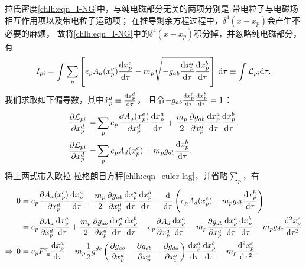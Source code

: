 拉氏密度\eqref{chlh:eqn_I-NG}中，与纯电磁部分无关的两项分别是
带电粒子与电磁场相互作用项以及带电粒子运动项；
在推导剩余方程过程中，$\delta^4(x-x_p)$会产生不必要的麻烦，
故将\eqref{chlh:eqn_I-NG}中的$\delta^4(x-x_p)$积分掉，并忽略纯电磁部分，有
\begin{equation}
    I_{pi} = \int \sum_{p}\left[ e_{p} A_{a}(x_p^\nu) \frac{{\rm d} x^a_p}{{\rm d} \tau} 
    -  m_p  \sqrt{-g_{ab} \frac{{\rm d} x_p^a}{{\rm d} \tau}
        \frac{{\rm d}x_p^b}{{\rm d} \tau} } \right]  \, {\rm d} \tau 
    \equiv \int \mathcal{L}_{pi} {\rm d}\tau.
\end{equation}
我们求取如下偏导数，其中$\dot{x}^d_p\equiv \frac{{\rm d}x_p^d}{{\rm d} \tau}$，
且令$-g_{ab} \frac{{\rm d} x_p^a}{{\rm d} \tau}\frac{{\rm d}x_p^b}{{\rm d} \tau}=1$：
\begin{align}
    \frac{\partial \mathcal{L}_{pi}}{\partial x^d_p}=& \sum_{p}
    e_{p} \frac{\partial A_{a}(x_p^e)}{\partial x^d_p} \frac{{\rm d} x^a_p}{{\rm d} \tau} 
    +\frac{m_p}{2} \frac{\partial g_{ab}}{\partial x^d_p}\frac{{\rm d} x_p^a}{{\rm d} \tau}
    \frac{{\rm d}x_p^b}{{\rm d} \tau} . \\
    \frac{\partial \mathcal{L}_{pi}}{\partial \dot{x}^d_p}=& \sum_{p}
    e_p A_d(x_p^e) + m_p g_{db} \frac{{\rm d} x_p^b}{{\rm d} \tau} .
\end{align}
将上两式带入欧拉-拉格朗日方程\eqref{chlh:eqn_euler-lag}，并省略$\sum_{p}$，有
\setlength{\mathindent}{0em}
\begin{align*}
    0&=e_{p} \frac{\partial A_{a}(x_p^e)}{\partial x^d_p} \frac{{\rm d} x^a_p}{{\rm d} \tau} 
    +\frac{m_p}{2} \frac{\partial g_{ab}}{\partial x^d_p}\frac{{\rm d} x_p^a}{{\rm d} \tau}
    \frac{{\rm d}x_p^b}{{\rm d} \tau}
    - \frac{{\rm d}}{{\rm d}{\tau}} \left( e_p A_d(x_p^e) 
    + m_p g_{db} \frac{{\rm d} x_p^b}{{\rm d} \tau}\right)  \\
    &= e_{p} \frac{\partial A_{a}}{\partial x^d_p} \frac{{\rm d} x^a_p}{{\rm d} \tau} 
    +\frac{m_p}{2} \frac{\partial g_{ab}}{\partial x^d_p}\frac{{\rm d} x_p^a}{{\rm d} \tau}
    \frac{{\rm d}x_p^b}{{\rm d} \tau}
    -e_{p} \frac{\partial A_{d}}{\partial x^a_p} \frac{{\rm d} x^a_p}{{\rm d} \tau} 
    -m_p \frac{\partial g_{db}}{\partial x_p^a} \frac{{\rm d} x_p^a}{{\rm d} \tau}\frac{{\rm d} x_p^b}{{\rm d} \tau}
    -m_p g_{dc} \frac{{\rm d}^2 x_p^c}{{\rm d} \tau^2} \\
   \Rightarrow\, 0 &= {e_p} F_{\hphantom{c}a}^c \frac{{\rm d} x^a_p}{{\rm d} \tau} 
    +m_p\frac{1}{2}g^{dc} \left( \frac{\partial g_{ab}}{\partial x_p^d}
    -\frac{\partial g_{db}}{\partial x_p^a} -\frac{\partial g_{da}}{\partial x_p^b}\right)
    \frac{{\rm d} x_p^a}{{\rm d} \tau}\frac{{\rm d} x_p^b}{{\rm d} \tau}
    -m_p\frac{{\rm d}^2 x_p^c}{{\rm d} \tau^2} .
\end{align*}\setlength{\mathindent}{2em}
